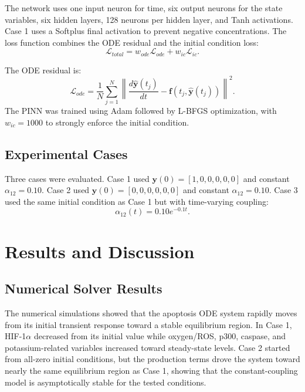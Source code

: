 \documentclass[conference]{IEEEtran}
\begin{document}
The network uses one input neuron for time, six output neurons for the state variables, six hidden layers, 128 neurons per hidden layer, and Tanh activations. Case 1 uses a Softplus final activation to prevent negative concentrations. The loss function combines the ODE residual and the initial condition loss:
\begin{equation}
\mathcal{L}_{total}=w_{ode}\mathcal{L}_{ode}+w_{ic}\mathcal{L}_{ic}.
\end{equation}

The ODE residual is:
\begin{equation}
\mathcal{L}_{ode}=\frac{1}{N}\sum_{j=1}^{N}\left\|
\frac{d\hat{\mathbf{y}}(t_j)}{dt}-\mathbf{f}(t_j,\hat{\mathbf{y}}(t_j))
\right\|^2.
\end{equation}
The PINN was trained using Adam followed by L-BFGS optimization, with $w_{ic}=1000$ to strongly enforce the initial condition.

\subsection{Experimental Cases}
Three cases were evaluated. Case 1 used $\mathbf{y}(0)=[1,0,0,0,0,0]$ and constant $\alpha_{12}=0.10$. Case 2 used $\mathbf{y}(0)=[0,0,0,0,0,0]$ and constant $\alpha_{12}=0.10$. Case 3 used the same initial condition as Case 1 but with time-varying coupling:
\begin{equation}
\alpha_{12}(t)=0.10e^{-0.1t}.
\end{equation}

\section{Results and Discussion}

\subsection{Numerical Solver Results}
The numerical simulations showed that the apoptosis ODE system rapidly moves from its initial transient response toward a stable equilibrium region. In Case 1, HIF-1$\alpha$ decreased from its initial value while oxygen/ROS, p300, caspase, and potassium-related variables increased toward steady-state levels. Case 2 started from all-zero initial conditions, but the production terms drove the system toward nearly the same equilibrium region as Case 1, showing that the constant-coupling model is asymptotically stable for the tested conditions.
\end{document}
